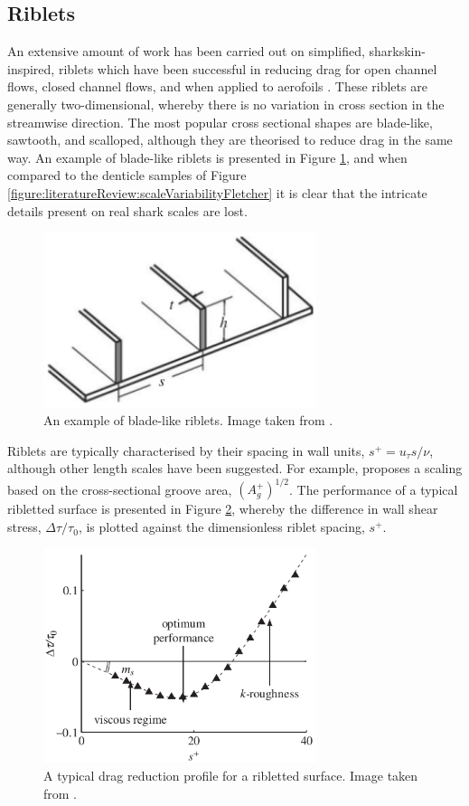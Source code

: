 \documentclass[12pt,oneside,a4paper]{article}
\begin{document}
\subsection{Riblets}
\label{section:literatureReview:Riblets}
An extensive amount of work has been carried out on simplified, sharkskin-inspired, riblets which have been successful in reducing drag for open channel flows, closed channel flows, and when applied to aerofoils \citep{bixler2013review}. These riblets are generally two-dimensional, whereby there is no variation in cross section in the streamwise direction. The most popular cross sectional shapes are blade-like, sawtooth, and scalloped, although they are theorised to reduce drag in the same way. An example of blade-like riblets is presented in Figure \ref{figure:literatureReview:bladeRiblets}, and when compared to the denticle samples of Figure \ref{figure:literatureReview:scaleVariabilityFletcher} it is clear that the intricate details present on real shark scales are lost.
%
\begin{figure}[!b]
\centering
\includegraphics[width=8cm]{images/bladeRiblets.png}
\caption{An example of blade-like riblets. Image taken from \cite{dean2010}.}
\label{figure:literatureReview:bladeRiblets}
\end{figure} 
%
Riblets are typically characterised by their spacing in wall units, $s^+ = u_\tau s / \nu$, although other length scales have been suggested. For example, \cite{garcia2011a} proposes a scaling based on the cross-sectional groove area, $(A_g^+)^{1/2}$. The performance of a typical ribletted surface is presented in Figure \ref{figure:literatureReview:ribletPerformanceRegions}, whereby the difference in wall shear stress, $\Delta \tau / \tau_0$, is plotted against the dimensionless riblet spacing, $s^+$.
%
\begin{figure}[!t]
\centering
\includegraphics[width=8cm]{images/litReview/ribletPerformanceRegions.png}
\caption{A typical drag reduction profile for a ribletted surface. Image taken from \cite{garcia2011}.}
\label{figure:literatureReview:ribletPerformanceRegions}
\end{figure}
\end{document}
